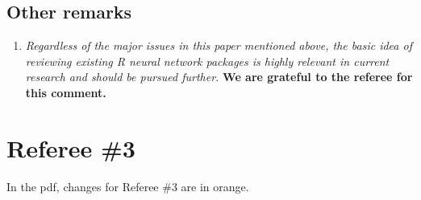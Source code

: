 \documentclass[12pt]{article}
\newcommand{\orange}[1]{{\color{orange}#1}}
\begin{document}
\subsection*{Other remarks}

\begin{enumerate}[resume]
\item \textit{Regardless of the major issues in this paper mentioned above, the basic idea of reviewing existing R neural network packages is highly relevant in current research and should be pursued further.
}
\textbf{We are grateful to the referee for this comment.}
\end{enumerate}



\section{Referee \#3}\label{referee3}

In the pdf, changes for Referee  \#3 are in \orange{orange}.  
\end{document}
